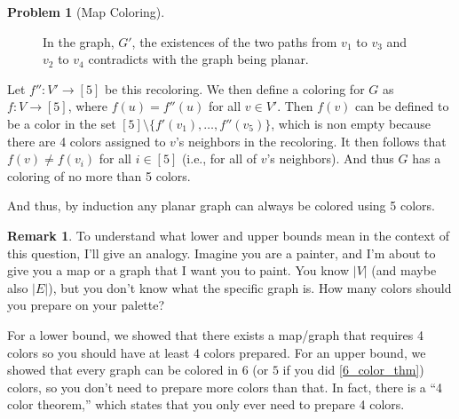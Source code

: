 \documentclass{article}
\theoremstyle{plain}
\theoremstyle{definition}
\newtheorem{problem}{Problem}
\newtheorem*{remark*}{Remark}
\newcommand{\ra}{\rightarrow}
\begin{document}
\begin{problem}[Map Coloring]
\begin{enumerate}
\begin{enumerate}
\begin{solution}
\begin{figure}[ht]
                \caption{In the graph, \(G'\), the existences of the two paths from \(v_1\) to \(v_3\) and \(v_2\) to \(v_4\) contradicts with the graph being planar.}
                \label{fig2}
            \end{figure}
    
                Let \(f'': V' \ra [5]\) be this recoloring. We then define a coloring for \(G\) as \(f : V \ra [5]\), where \(f(u) = f''(u)\) for all \(v \in V'\). Then \(f(v)\) can be defined to be a color in the set \([5] \setminus \{f'(v_1), \dotsc, f''(v_5)\}\), which is non empty because there are 4 colors assigned to \(v\)'s neighbors in the recoloring. It then follows that \(f(v) \neq f(v_i)\) for all \(i \in [5]\) (i.e., for all of \(v\)'s neighbors). And thus \(G\) has a coloring of no more than 5 colors.
    
                And thus, by induction any planar graph can always be colored using 5 colors.
            \end{solution}
        \end{enumerate}
    \end{enumerate}

    \begin{remark*}
            To understand what lower and upper bounds mean in the context of this question, I'll give an analogy. Imagine you are a painter, and I'm about to give you a map or a graph that I want you to paint. You know \(|V|\) (and maybe also \(|E|\)), but you don't know what the specific graph is. How many colors should you prepare on your palette?

            For a lower bound, we showed that there exists a map/graph that requires 4 colors so you should have at least 4 colors prepared. For an upper bound, we showed that every graph can be colored in \(6\) (or \(5\) if you did \cref{6_color_thm}) colors, so you don't need to prepare more colors than that. In fact, there is a ``4 color theorem,'' which states that you only ever need to prepare 4 colors.
        \end{remark*}
\end{problem}
\end{document}
